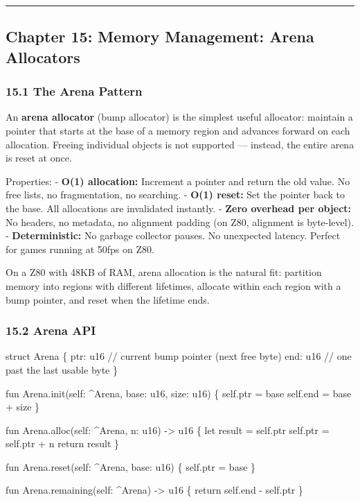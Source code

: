 \documentclass[
  11pt,
]{article}
\newenvironment{Shaded}{}{}
\newcommand{\NormalTok}[1]{#1}
\begin{document}
\begin{center}\rule{0.5\linewidth}{0.5pt}\end{center}

\subsection{Chapter 15: Memory Management: Arena
Allocators}\label{chapter-15-memory-management-arena-allocators}

\subsubsection{15.1 The Arena Pattern}\label{the-arena-pattern}

An \textbf{arena allocator} (bump allocator) is the simplest useful
allocator: maintain a pointer that starts at the base of a memory region
and advances forward on each allocation. Freeing individual objects is
not supported --- instead, the entire arena is reset at once.

Properties: - \textbf{O(1) allocation:} Increment a pointer and return
the old value. No free lists, no fragmentation, no searching. -
\textbf{O(1) reset:} Set the pointer back to the base. All allocations
are invalidated instantly. - \textbf{Zero overhead per object:} No
headers, no metadata, no alignment padding (on Z80, alignment is
byte-level). - \textbf{Deterministic:} No garbage collector pauses. No
unexpected latency. Perfect for games running at 50fps on Z80.

On a Z80 with 48KB of RAM, arena allocation is the natural fit:
partition memory into regions with different lifetimes, allocate within
each region with a bump pointer, and reset when the lifetime ends.

\subsubsection{15.2 Arena API}\label{arena-api}

\begin{Shaded}
\begin{Highlighting}[]
\NormalTok{struct Arena \{}
\NormalTok{    ptr: u16    // current bump pointer (next free byte)}
\NormalTok{    end: u16    // one past the last usable byte}
\NormalTok{\}}

\NormalTok{fun Arena.init(self: \^{}Arena, base: u16, size: u16) \{}
\NormalTok{    self.ptr = base}
\NormalTok{    self.end = base + size}
\NormalTok{\}}

\NormalTok{fun Arena.alloc(self: \^{}Arena, n: u16) {-}\textgreater{} u16 \{}
\NormalTok{    let result = self.ptr}
\NormalTok{    self.ptr = self.ptr + n}
\NormalTok{    return result}
\NormalTok{\}}

\NormalTok{fun Arena.reset(self: \^{}Arena, base: u16) \{}
\NormalTok{    self.ptr = base}
\NormalTok{\}}

\NormalTok{fun Arena.remaining(self: \^{}Arena) {-}\textgreater{} u16 \{}
\NormalTok{    return self.end {-} self.ptr}
\NormalTok{\}}
\end{Highlighting}
\end{Shaded}
\end{document}
